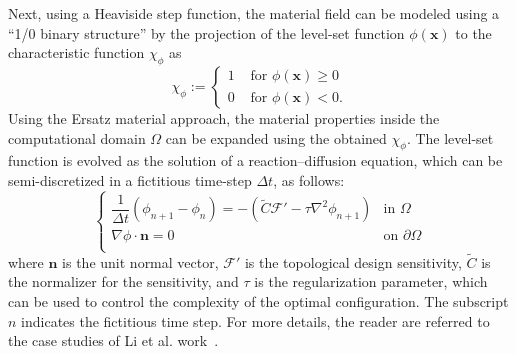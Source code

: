 Next, using a Heaviside step function, the material field can be modeled using a ``1/0 binary structure'' by the projection of the level-set function $\phi(\mathbf{x})$ to the characteristic function $\chi_{\phi}$ as
\begin{equation}
	\chi_{\phi} :=\left\{\begin{array}{ll}
		{1} & {\text { for } \phi\left( \boldsymbol{x} \right) \geq 0} \\
		{0} & {\text { for } \phi\left( \boldsymbol{x} \right)<0}.
		\label{eq: characteristic function}
	\end{array}\right.
\end{equation}
Using the Ersatz material approach, the material properties inside the computational domain $\Omega$ can be expanded using the obtained $\chi_{\phi}$. The level-set function is evolved as the solution of a reaction--diffusion equation, which can be semi-discretized in a fictitious time-step $\Delta t$, as follows:
\begin{equation}
	\left\{\begin{array}{ll}
		\dfrac{1}{\Delta t} \left( \phi_{n+1} - \phi_{n} \right) =- \left( \tilde{C} \mathcal{F}' -\tau \nabla^{2} \phi_{n+1} \right) & \text{in }\Omega\\
		\nabla \phi \cdot \boldsymbol{n} = 0 & \text{on } \partial\Omega \\
	\end{array}\right.
	\label{eq: reaction diffusion equation semi discretize}
\end{equation}
where $\boldsymbol{n}$ is the unit normal vector, $\mathcal{F}'$ is the topological design sensitivity, $\tilde{C}$ is the normalizer for the sensitivity, and $\tau$ is the regularization parameter, which can be used to control the complexity of the optimal configuration. The subscript $n$ indicates the fictitious time step. For more details, the reader are referred to the case studies of Li et al. work\ \cite{li2021full}. 

